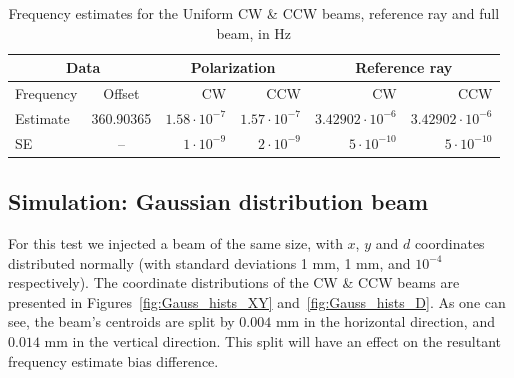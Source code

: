 \documentclass{article}
\begin{document}
\begin{table}[!h]
  \centering
  \caption{Frequency estimates for the Uniform CW \& CCW beams, reference ray and full beam, in Hz\label{tbl:FreqFit}}
  \begin{tabular}{lc|rr|rr}
    \hline
    \multicolumn{2}{c}{Data}  & \multicolumn{2}{|c|}{Polarization} & \multicolumn{2}{|c}{Reference ray} \\
    \hline
      Frequency & Offset & CW  & CCW & CW & CCW \\
    \hline
    Estimate & 360.90365 & $1.58\cdot 10^{-7}$ & $1.57\cdot 10^{-7}$ & $3.42902\cdot 10^{-6}$ & $3.42902\cdot 10^{-6}$ \\
    SE & -- & $1\cdot 10^{-9}$& $2\cdot 10^{-9}$ & $5\cdot 10^{-10}$ & $5\cdot 10^{-10}$\\
    \hline
  \end{tabular}
\end{table}



\subsection{Simulation: Gaussian distribution beam}
For this test we injected a beam of the same size, with $x$, $y$ and $d$ coordinates distributed normally (with standard deviations 1 mm, 1 mm, and $10^{-4}$ respectively). The coordinate distributions of the CW \& CCW beams are presented in Figures~\ref{fig:Gauss_hists_XY} and~\ref{fig:Gauss_hists_D}. As one can see, the beam's centroids are split by $0.004$ mm in the horizontal direction, and $0.014$ mm in the vertical direction. This split will have an effect on the resultant frequency estimate bias difference.
\end{document}
